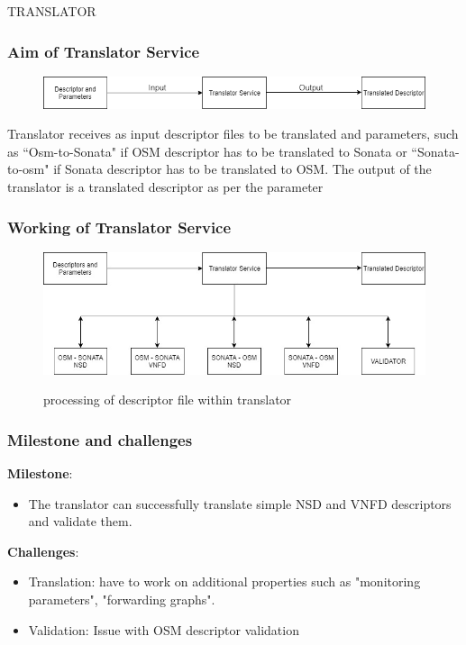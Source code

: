 \begin{frame}

\Huge{\centerline{TRANSLATOR}}
\end{frame}

\begin{frame}
\frametitle{Aim of Translator Service}
\begin{figure}
\centering
\includegraphics[width=1\linewidth]{images/img-1-translate}
\label{Figure1}
\end{figure}
Translator receives as input descriptor files to be translated and parameters, such as ``Osm-to-Sonata" if OSM descriptor has to be translated to Sonata or ``Sonata-to-osm" if Sonata descriptor has to be translated to OSM. The output of the translator is a translated descriptor as per the parameter 
\end{frame}

\begin{frame}
\frametitle{Working of Translator Service}
\begin{figure}
\centering
\includegraphics[width=1\linewidth]{images/img-2-translate}
\label{Figure2}
\caption{processing of descriptor file within translator}
\end{figure}
\end{frame}

\begin{frame}
\frametitle{Milestone and challenges}
\textbf{Milestone}:\\
\begin{itemize}
\item The translator can successfully translate simple NSD and VNFD descriptors and validate them.
\end{itemize}

\textbf{Challenges}:\\
\begin{itemize}
\item Translation: have  to work on additional properties such as "monitoring parameters", "forwarding graphs".
\item Validation: Issue with OSM descriptor validation
\end{itemize}

\end{frame}